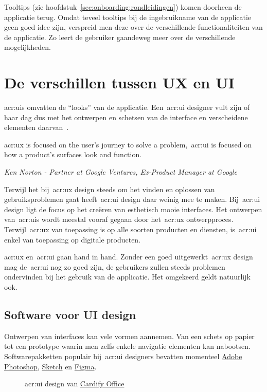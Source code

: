 Tooltips (zie hoofdstuk~\ref{sec:onboarding:rondleidingen}) komen doorheen de applicatie terug. Omdat teveel tooltips bij de ingebruikname van de applicatie geen goed idee zijn, verspreid men deze over de verschillende functionaliteiten van de applicatie. Zo leert de gebruiker gaandeweg meer over de verschillende mogelijkheden.

\section{De verschillen tussen UX en UI}
\label{sec:ux-vs-ui}

\Glspl{acr:ui} omvatten de ``looks'' van de applicatie. Een~\acrshort{acr:ui} designer vult zijn of haar dag dus met het ontwerpen en schetsen van de interface en verscheidene elementen daarvan~\autocite{Lamprecht2019}.

\epigraph{\acrshort{acr:ux} is focused on the user’s journey to solve a problem,~\acrshort{acr:ui} is focused on how a product’s surfaces look and function.}{\textit{Ken Norton - Partner at Google Ventures, Ex-Product Manager at Google}}

Terwijl het bij~\acrshort{acr:ux} design steeds om het vinden en oplossen van gebruiksproblemen gaat heeft~\acrshort{acr:ui} design daar weinig mee te maken. Bij~\acrshort{acr:ui} design ligt de focus op het creëren van esthetisch mooie interfaces. Het ontwerpen van~\glspl{acr:ui} wordt meestal vooraf gegaan door het~\acrshort{acr:ux} ontwerpproces. Terwijl~\acrshort{acr:ux} van toepassing is op alle soorten producten en diensten, is~\acrshort{acr:ui} enkel van toepassing op digitale producten.

\acrfull{acr:ux} en~\acrfull{acr:ui} gaan hand in hand. Zonder een goed uitgewerkt~\acrshort{acr:ux} design mag de~\acrshort{acr:ui} nog zo goed zijn, de gebruikers zullen steeds problemen ondervinden bij het gebruik van de applicatie. Het omgekeerd geldt natuurlijk ook.

\subsection{Software voor UI design}
\label{sec:ux-vs-ui:software}

Ontwerpen van interfaces kan vele vormen aannemen. Van een schets op papier tot een prototype waarin men zelfs enkele navigatie elementen kan nabootsen. Softwarepakketten populair bij~\acrshort{acr:ui} designers bevatten momenteel \href{https://www.adobe.com/products/photoshop.html}{Adobe Photoshop}, \href{https://www.sketch.com/}{Sketch} en \href{https://www.figma.com/}{Figma}.

\begin{figure}[h!]
    \centering
    \qquad
    \caption[Voorbeeld \acrshort{acr:ui}-designproces]{\acrshort{acr:ui} design van \href{https://office.getcardify.com/}{Cardify Office}}
    \label{fig:ux-vs-ui:software}
\end{figure}
